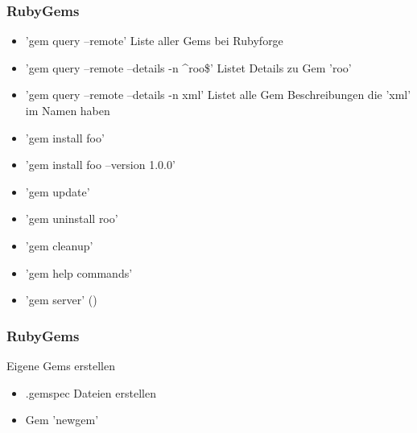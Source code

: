 \begin{frame}
  \frametitle{RubyGems}
  \begin{itemize}
  
    \item 'gem query --remote' Liste aller Gems bei Rubyforge
    \item 'gem query --remote --details -n ^roo\$' Listet Details zu Gem 'roo' 
    \item 'gem query --remote --details -n xml' Listet alle Gem Beschreibungen die 'xml' im Namen haben
    \item 'gem install foo'
    \item 'gem install foo --version 1.0.0'
    \item 'gem update'
    \item 'gem uninstall roo'
    \item 'gem cleanup'
    \item 'gem help commands'
    \item 'gem server' ()
  \end{itemize}
\end{frame}

\begin{frame}
  \frametitle{RubyGems}
  Eigene Gems erstellen
  \begin{itemize}
    \item .gemspec Dateien erstellen
    \item Gem 'newgem'
  \end{itemize}
\end{frame}

